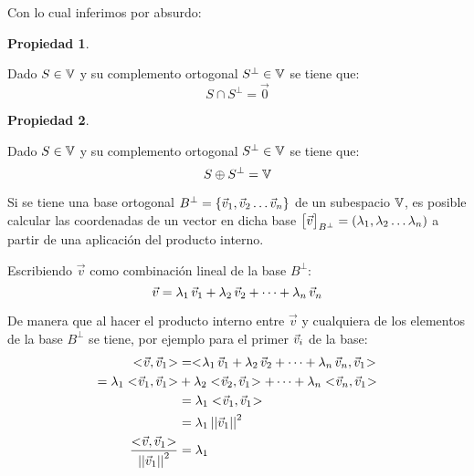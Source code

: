 \documentclass[a5paper,12pt,twoside]{book}
\newtheorem{prop}{{Propiedad}}[chapter]
\begin{document}
Con lo cual inferimos por absurdo:

\begin{mdframed}[style=PropertyFrame]
    \begin{prop}
    \end{prop}
    Dado $S \in \mathbb{V}$ y su complemento ortogonal $S^\perp \in \mathbb{V}$ se tiene que:
    \begin{equation*}
        S \cap S^\perp = \Vec{0}
    \end{equation*}
\end{mdframed}

\begin{mdframed}[style=PropertyFrame]
    \begin{prop}
        \label{prop:comp2}
    \end{prop}
    Dado $S \in \mathbb{V}$ y su complemento ortogonal $S^\perp \in \mathbb{V}$ se tiene que:
    \begin{equation*}
        S \oplus S^\perp = \mathbb{V}
    \end{equation*}
\end{mdframed}

Si se tiene una base ortogonal $B^\perp = { \left\{ {\Vec{v}_1 , \Vec{v}_2 \dots \Vec{v}_n} \right\} }$ de un subespacio $\mathbb{V}$, es posible calcular las coordenadas de un vector en dicha base ${ \begin{bmatrix} \Vec{v} \end{bmatrix} }_{B^\perp}=(\lambda_1 , \lambda_2 \dots \lambda_n)$ a partir de una aplicación del producto interno.

Escribiendo $\Vec{v}$ como combinación lineal de la base $B^\perp$:
\begin{equation*}
    \Vec{v} = \lambda_1 \, \Vec{v}_1 + \lambda_2 \, \Vec{v}_2 + \dots + \lambda_n \, \Vec{v}_n
\end{equation*}

De manera que al hacer el producto interno entre $\Vec{v}$ y cualquiera de los elementos de la base $B^\perp$ se tiene, por ejemplo para el primer $\Vec{v}_i$ de la base:
\begin{align*}
    \intProd{\Vec{v}}{\Vec{v}_1} &= \intProd{\lambda_1 \, \Vec{v}_1 + \lambda_2 \, \Vec{v}_2 + \dots + \lambda_\nth \, \Vec{v}_\nth}{\Vec{v}_1}
    \\
    = \lambda_1 \intProd{\Vec{v}_1}{\Vec{v}_1} &+ \lambda_2 \intProd{\Vec{v}_2}{\Vec{v}_1} + \dots + \lambda_\nth \intProd{\Vec{v}_\nth}{\Vec{v}_1}
    \\
    &= \lambda_1 \intProd{\Vec{v}_1}{\Vec{v}_1}
    \\
    &= \lambda_1 \, \nnorm{\Vec{v}_1}^2
    \\
    \frac{\intProd{\Vec{v}}{\Vec{v}_1}}{\nnorm{\Vec{v}_1}^2}&= \lambda_1
\end{align*}
\end{document}
